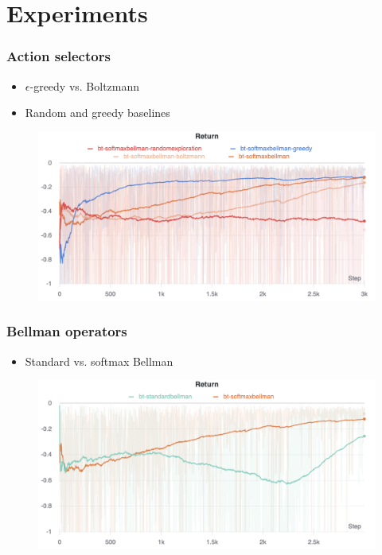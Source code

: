 \documentclass{beamer}
\begin{document}
\section{Experiments}
\begin{frame}
	\frametitle{Action selectors}
	\begin{itemize}
		\item $\epsilon$-greedy vs. Boltzmann
		\item Random and greedy baselines
	\end{itemize}
	\begin{figure}[h]
		\centering
		\includegraphics[width=\textwidth]{action-selectors-returns}
	\end{figure}
\end{frame}

\begin{frame}
	\frametitle{Bellman operators}
	\begin{itemize}
		\item Standard vs. softmax Bellman
	\end{itemize}
	\begin{figure}[h]
		\centering
		\includegraphics[width=\textwidth]{bellman-operators-returns.png}
	\end{figure}
\end{frame}
\end{document}
